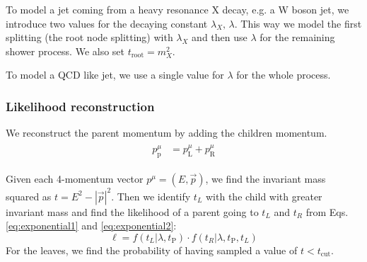 \documentclass[12pt]{article}
\def\beq{\begin{equation}}
\def\eeq{\end{equation}}
\def\beq{\begin{equation}}
\def\eeq{\end{equation}}
\newcommand{\bea}{\begin{eqnarray}\begin{aligned}}
\newcommand{\eea}{\end{aligned}\end{eqnarray}}
\begin{document}
To model a jet coming from a heavy resonance X decay, e.g. a W boson jet, we introduce two values for the decaying constant $\lambda_X, \, \lambda$. This way we model the first splitting (the root node splitting) with $\lambda_X$ and then use $\lambda$ for the remaining shower process. We also set $t_\text{root} = m_X^2$.

To model a QCD like jet, we use a single value for $\lambda$ for the whole process.


\subsubsection{Likelihood reconstruction}

We reconstruct the parent momentum by adding the children momentum. 
\bea
{p}^\mu_\text{p} &= p^\mu_\text{L}+ p^\mu_\text{R}
\eea


Given each 4-momentum vector $p^\mu = (E, \vec{p})$, we find the invariant mass squared as $t= E^2-|\vec{p}|^2$. 
Then we identify $t_L$ with the child with greater invariant mass and find the likelihood of a parent going to $t_L$ and $t_R$ from Eqs. \ref{eq:exponential1} and \ref{eq:exponential2}:
\beq
\ell= f(t_L | \lambda, t_{\text{P}}) \cdot f(t_R | \lambda, t_{\text{P}}, t_L)
\eeq
For the leaves, we find the probability of having sampled a value of $t < t_{\text{cut}}$.


%
\end{document}
